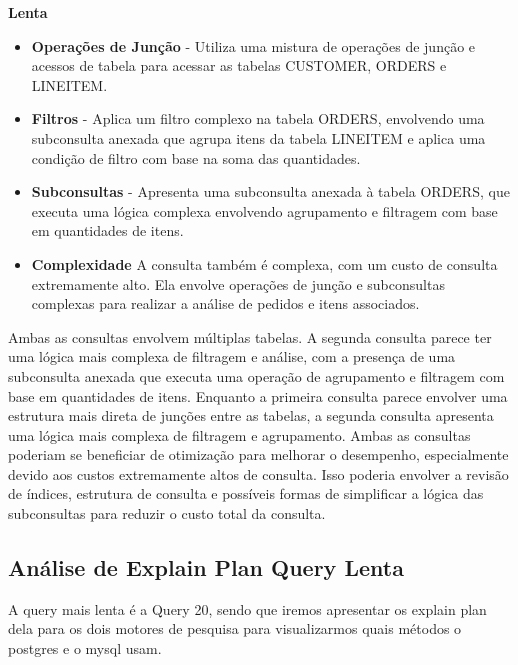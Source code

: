\documentclass{article}
\begin{document}
  \textbf{Lenta}\\
  \begin{itemize}
    \item \textbf{Operações de Junção} - Utiliza uma mistura de operações de junção e acessos de tabela para acessar as tabelas CUSTOMER, ORDERS e LINEITEM.
    \item \textbf{Filtros} - Aplica um filtro complexo na tabela ORDERS, envolvendo uma subconsulta anexada que agrupa itens da tabela LINEITEM e aplica uma condição de filtro com base na soma das quantidades.
    \item \textbf{Subconsultas} - Apresenta uma subconsulta anexada à tabela ORDERS, que executa uma lógica complexa envolvendo agrupamento e filtragem com base em quantidades de itens.
    \item\textbf{Complexidade} A consulta também é complexa, com um custo de consulta extremamente alto. Ela envolve operações de junção e subconsultas complexas para realizar a análise de pedidos e itens associados.
  \end{itemize}
  \texttt{}\par Ambas as consultas envolvem múltiplas tabelas.
  A segunda consulta parece ter uma lógica mais complexa de filtragem e análise, com a presença de uma subconsulta anexada que executa uma operação de agrupamento e filtragem com base em quantidades de itens.
  Enquanto a primeira consulta parece envolver uma estrutura mais direta de junções entre as tabelas, a segunda consulta apresenta uma lógica mais complexa de filtragem e agrupamento.
  Ambas as consultas poderiam se beneficiar de otimização para melhorar o desempenho, especialmente devido aos custos extremamente altos de consulta. Isso poderia envolver a revisão de índices, estrutura de consulta e possíveis formas de simplificar a lógica das subconsultas para reduzir o custo total da consulta.

\clearpage
\subsection{Análise de Explain Plan Query Lenta}


\texttt{}\par A query mais lenta é a Query 20, sendo que iremos apresentar os explain plan dela para os dois motores de pesquisa para visualizarmos quais métodos o postgres e o mysql usam.
\end{document}
